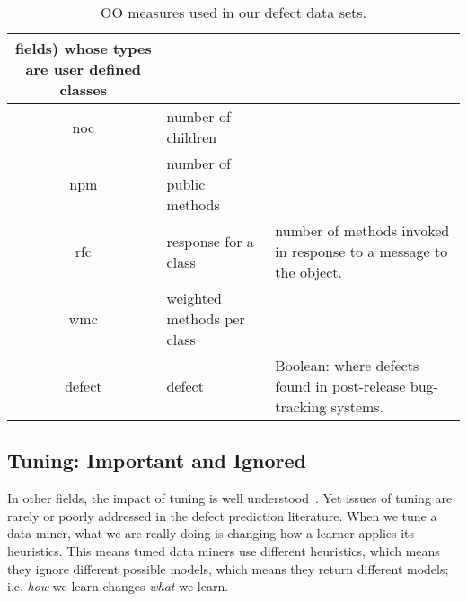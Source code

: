 \begin{table*}[t]
\begin{center}
{\begin{tabular}{c|l|p{4.7in}}
fields) whose types are user defined classes\\\hline
noc &  number of children &\\\hline
npm & number of public methods & \\\hline
rfc & response for a class &number of  methods invoked in response to
a message to the object.\\\hline
wmc & weighted methods per class &\\\hline
\rowcolor{lightgray}
defect & defect & Boolean: where defects found in post-release bug-tracking systems.
\end{tabular}
}
\end{center}
\caption{OO measures used in our defect data sets.}\label{tab:ck}
\end{table*}



 

\subsection{Tuning: Important and Ignored}

In  other fields, the impact of tuning is well understood~\cite{Bergstra2012}. 
Yet issues of tuning  are rarely or poorly addressed
in the defect prediction literature.
When we tune a data miner, what we are really doing is changing how a learner applies
its heuristics. This means tuned data miners use different heuristics, which means they ignore different possible models, which means they return different models; i.e.  {\em how} we learn changes {\em what} we learn.


